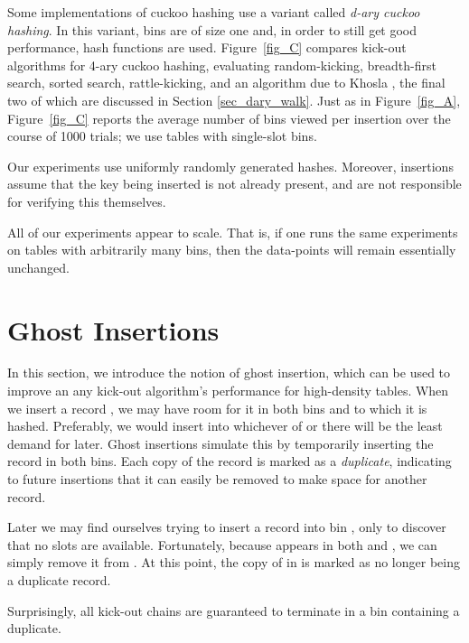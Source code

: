 \documentclass{sig-alternate-05-2015}
\begin{document}
Some implementations of cuckoo hashing use a variant called
\emph{d-ary cuckoo hashing}. In this variant, bins are of size one
and, in order to still get good performance,  hash functions are
used. Figure~\ref{fig_C} compares kick-out algorithms for 4-ary cuckoo
hashing, evaluating random-kicking, breadth-first search, sorted
search, rattle-kicking, and an algorithm due to Khosla
\cite{khosla13}, the final two of which are discussed in Section
\ref{sec_dary_walk}.  Just as in Figure~\ref{fig_A},
Figure~\ref{fig_C} reports the average number of bins viewed per
insertion over the course of 1000 trials; we use tables with 
single-slot bins.

Our experiments use uniformly randomly generated hashes. Moreover,
insertions assume that the key being inserted is not already present,
and are not responsible for verifying this themselves.

All of our experiments appear to scale. That is, if one runs the same
experiments on tables with arbitrarily many bins, then the data-points
will remain essentially unchanged.



\section{Ghost Insertions}\label{secghost}

In this section, we introduce the notion of ghost insertion, which can
be used to improve an any kick-out algorithm's performance for
high-density tables. When we insert a record , we may have room
for it in both bins  and  to which it is hashed. Preferably,
we would insert  into whichever of  or  there will be
the least demand for later. Ghost insertions simulate this by
temporarily inserting the record in both bins. Each copy of the record
is marked as a \emph{duplicate}, indicating to future insertions that
it can easily be removed to make space for another record.
  


Later we may find ourselves trying to insert a record  into bin
, only to discover that no slots are available. Fortunately,
because  appears in both  and , we can simply remove it
from . At this point, the copy of  in  is marked as no
longer being a duplicate record.

Surprisingly, all kick-out chains are guaranteed to terminate in a bin
containing a duplicate.
\end{document}
